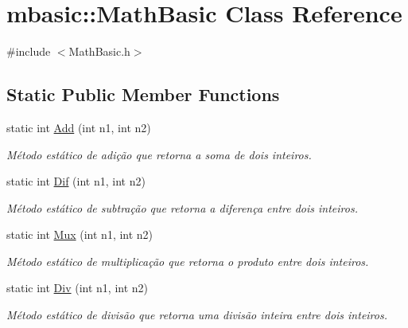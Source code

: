 \hypertarget{classmbasic_1_1MathBasic}{\section{mbasic\-:\-:Math\-Basic Class Reference}
\label{classmbasic_1_1MathBasic}
}


{\ttfamily \#include $<$Math\-Basic.\-h$>$}

\subsection*{Static Public Member Functions}
\begin{DoxyCompactItemize}
\item 
static int \hyperlink{classmbasic_1_1MathBasic_a0c8d1d4bdfb2490818b7350f3cd947fa}{Add} (int n1, int n2)
\begin{DoxyCompactList}\small\item\em Método estático de adição que retorna a soma de dois inteiros. \end{DoxyCompactList}\item 
static int \hyperlink{classmbasic_1_1MathBasic_a74ab16017f20077b28738552df0b1bae}{Dif} (int n1, int n2)
\begin{DoxyCompactList}\small\item\em Método estático de subtração que retorna a diferença entre dois inteiros. \end{DoxyCompactList}\item 
static int \hyperlink{classmbasic_1_1MathBasic_a6554a2cc7705aedfd1572a424a139e13}{Mux} (int n1, int n2)
\begin{DoxyCompactList}\small\item\em Método estático de multiplicação que retorna o produto entre dois inteiros. \end{DoxyCompactList}\item 
static int \hyperlink{classmbasic_1_1MathBasic_ab4aae23139bd3f1997cf298524cf15b4}{Div} (int n1, int n2)
\begin{DoxyCompactList}\small\item\em Método estático de divisão que retorna uma divisão inteira entre dois inteiros. \end{DoxyCompactList}\end{DoxyCompactItemize}


